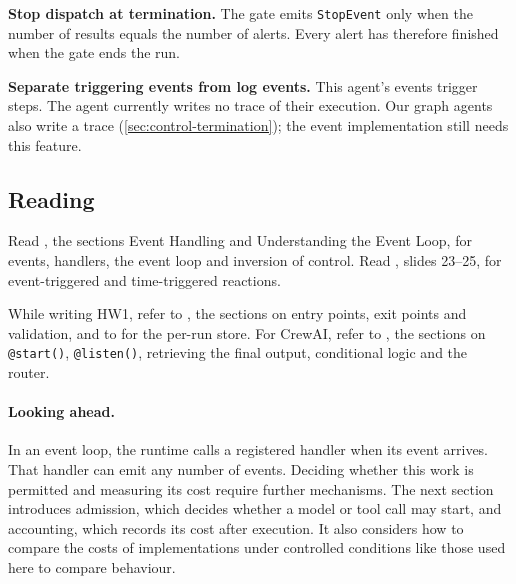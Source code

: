 \item \textbf{Stop dispatch at termination.} The gate emits \texttt{StopEvent} only when the
number of results equals the number of alerts. Every alert has therefore finished when the gate
ends the run.

\item \textbf{Separate triggering events from log events.} This agent's events trigger steps.
The agent currently writes no trace of their execution. Our graph agents also write a trace
(\cref{sec:control-termination}); the event implementation still needs this feature.

\ei

\subsection{Reading}

Read \citet{cornell-cs2110-lec25}, the sections Event Handling and Understanding the Event
Loop, for events, handlers, the event loop and inversion of control. Read \citet{seshia2015discrete},
slides 23--25, for event-triggered and time-triggered reactions.

While writing HW1, refer to \citet{llamaindex-workflows}, the sections on entry points, exit
points and validation, and to \citet{llamaindex-workflows-state} for the per-run store. For CrewAI,
refer to \citet{crewai-flows}, the sections on \texttt{@start()}, \texttt{@listen()}, retrieving
the final output, conditional logic and the router.

\paragraph{Looking ahead.} In an event loop, the runtime calls a registered handler when its event
arrives. That handler can emit any number of events. Deciding whether this work is permitted and
measuring its cost require further mechanisms. The next section introduces admission, which
decides whether a model or tool call may start, and accounting, which records its cost after
execution. It also considers how to compare the costs of implementations under controlled
conditions like those used here to compare behaviour.
